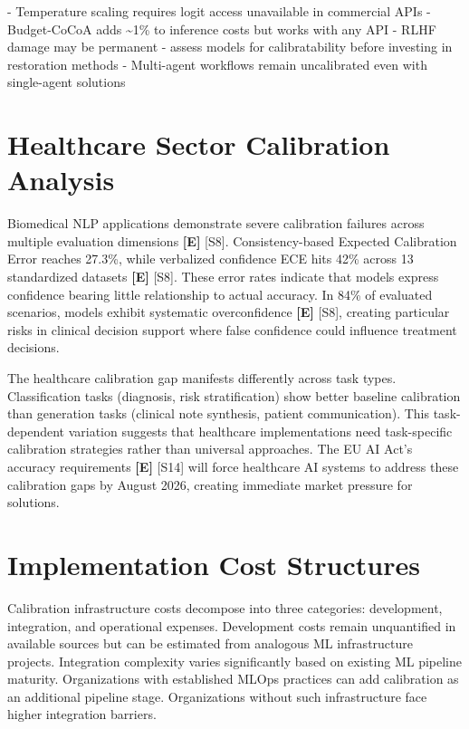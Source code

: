 \documentclass[a4paper,11pt]{article}
\newcommand{\elabel}{\textbf{\textcolor{ecolor}{[E]}}}
\begin{document}
\begin{decisionbox}
- Temperature scaling requires logit access unavailable in commercial APIs
- Budget-CoCoA adds \textasciitilde{}1\% to inference costs but works with any API
- RLHF damage may be permanent - assess models for calibratability before investing in restoration methods
- Multi-agent workflows remain uncalibrated even with single-agent solutions
\end{decisionbox}


\section{Healthcare Sector Calibration Analysis}

Biomedical NLP applications demonstrate severe calibration failures across multiple evaluation dimensions \elabel{} \textcolor{primary}{[S8]}. Consistency-based Expected Calibration Error reaches 27.3\%, while verbalized confidence ECE hits 42\% across 13 standardized datasets \elabel{} \textcolor{primary}{[S8]}. These error rates indicate that models express confidence bearing little relationship to actual accuracy. In 84\% of evaluated scenarios, models exhibit systematic overconfidence \elabel{} \textcolor{primary}{[S8]}, creating particular risks in clinical decision support where false confidence could influence treatment decisions.


The healthcare calibration gap manifests differently across task types. Classification tasks (diagnosis, risk stratification) show better baseline calibration than generation tasks (clinical note synthesis, patient communication). This task-dependent variation suggests that healthcare implementations need task-specific calibration strategies rather than universal approaches. The EU AI Act's accuracy requirements \elabel{} \textcolor{primary}{[S14]} will force healthcare AI systems to address these calibration gaps by August 2026, creating immediate market pressure for solutions.


\section{Implementation Cost Structures}

Calibration infrastructure costs decompose into three categories: development, integration, and operational expenses. Development costs remain unquantified in available sources but can be estimated from analogous ML infrastructure projects. Integration complexity varies significantly based on existing ML pipeline maturity. Organizations with established MLOps practices can add calibration as an additional pipeline stage. Organizations without such infrastructure face higher integration barriers.
\end{document}
